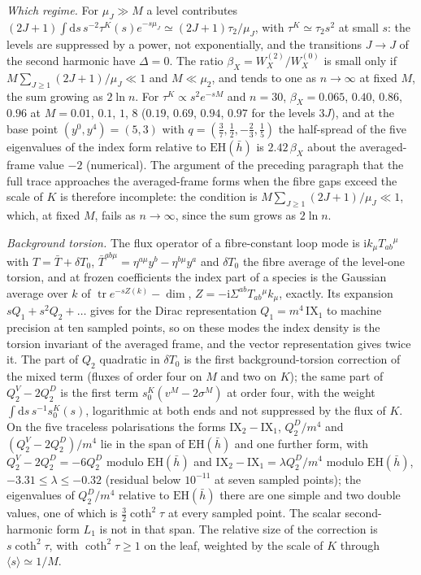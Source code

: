 \emph{Which regime.} For \(\mu_J\gg M\) a level contributes \((2J+1)\int\mathrm ds\,s^{-2}\tau^K(s)e^{-s\mu_J}\simeq(2J+1)\tau_2/\mu_J\), with \(\tau^K\simeq\tau_2s^2\) at small \(s\): the levels are suppressed by a power, not exponentially, and the transitions \(J\to J\) of the second harmonic have \(\Delta=0\). The ratio \(\beta_X=W_X^{(2)}/W_X^{(0)}\) is small only if \(M\sum_{J\ge1}(2J+1)/\mu_J\ll1\) and \(M\ll\mu_2\), and tends to one as \(n\to\infty\) at fixed \(M\), the sum growing as \(2\ln n\). For \(\tau^K\propto s^2e^{-sM}\) and \(n=30\), \(\beta_X=0.065\), \(0.40\), \(0.86\), \(0.96\) at \(M=0.01\), \(0.1\), \(1\), \(8\) (\(0.19\), \(0.69\), \(0.94\), \(0.97\) for the levels \(3J\)), and at the base point \((y^0,y^4)=(5,3)\) with \(q=(\tfrac37,\tfrac12,-\tfrac23,\tfrac15)\) the half-spread of the five eigenvalues of the index form relative to \(\mathrm{EH}(\bar h)\) is \(2.42\,\beta_X\) about the averaged-frame value \(-2\) (numerical). The argument of the preceding paragraph that the full trace approaches the averaged-frame forms when the fibre gaps exceed the scale of \(K\) is therefore incomplete: the condition is \(M\sum_{J\ge1}(2J+1)/\mu_J\ll1\), which, at fixed \(M\), fails as \(n\to\infty\), since the sum grows as \(2\ln n\).

\emph{Background torsion.} The flux operator of a fibre-constant loop mode is \(\mathrm ik_\mu T_{ab}{}^\mu\) with \(T=\bar T+\delta T_0\), \(\bar T^{ab\mu}=\eta^{a\mu}y^b-\eta^{b\mu}y^a\) and \(\delta T_0\) the fibre average of the level-one torsion, and at frozen coefficients the index part of a species is the Gaussian average over \(k\) of \(\operatorname{tr}e^{-sZ(k)}-\dim\), \(Z=-\mathrm i\Sigma^{ab}T_{ab}{}^\mu k_\mu\), exactly. Its expansion \(sQ_1+s^2Q_2+\dots\) gives for the Dirac representation \(Q_1=m^4\,\mathrm{IX}_1\) to machine precision at ten sampled points, so on these modes the index density is the torsion invariant of the averaged frame, and the vector representation gives twice it. The part of \(Q_2\) quadratic in \(\delta T_0\) is the first background-torsion correction of the mixed term (fluxes of order four on \(M\) and two on \(K\)); the same part of \(Q_2^V-2Q_2^D\) is the first term \(s_0^K(v^M-2\sigma^M)\) at order four, with the weight \(\int\mathrm ds\,s^{-1}s_0^K(s)\), logarithmic at both ends and not suppressed by the flux of \(K\). On the five traceless polarisations the forms \(\mathrm{IX}_2-\mathrm{IX}_1\), \(Q_2^D/m^4\) and \((Q_2^V-2Q_2^D)/m^4\) lie in the span of \(\mathrm{EH}(\bar h)\) and one further form, with \(Q_2^V-2Q_2^D=-6Q_2^D\) modulo \(\mathrm{EH}(\bar h)\) and \(\mathrm{IX}_2-\mathrm{IX}_1=\lambda Q_2^D/m^4\) modulo \(\mathrm{EH}(\bar h)\), \(-3.31\le\lambda\le-0.32\) (residual below \(10^{-11}\) at seven sampled points); the eigenvalues of \(Q_2^D/m^4\) relative to \(\mathrm{EH}(\bar h)\) there are one simple and two double values, one of which is \(\tfrac32\coth^2\tau\) at every sampled point. The scalar second-harmonic form \(L_1\) is not in that span. The relative size of the correction is \(s\coth^2\tau\), with \(\coth^2\tau\ge1\) on the leaf, weighted by the scale of \(K\) through \(\langle s\rangle\simeq1/M\).


